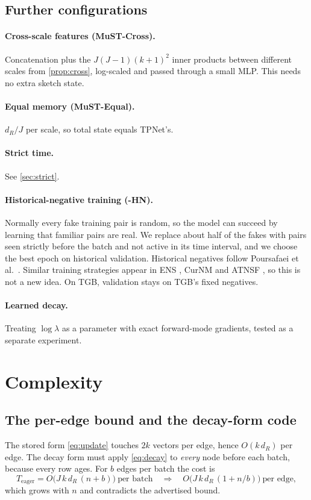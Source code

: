 \documentclass[11pt,a4paper]{article}
\theoremstyle{remark}
\begin{document}
\subsection{Further configurations}
\paragraph{Cross-scale features (MuST-Cross).} Concatenation plus the $J(J-1)(k+1)^2$ inner products between different scales from \cref{prop:cross}, log-scaled and passed through a small MLP. This needs no extra sketch state.
\paragraph{Equal memory (MuST-Equal).} $d_R/J$ per scale, so total state equals TPNet's.
\paragraph{Strict time.} See \cref{sec:strict}.
\paragraph{Historical-negative training (-HN).} Normally every fake training pair is random, so the model can succeed by learning that familiar pairs are real. We replace about half of the fakes with pairs seen strictly before the batch and not active in its time interval, and we choose the best epoch on historical validation. Historical negatives follow Poursafaei et al.\ \cite{poursafaei}. Similar training strategies appear in ENS \cite{ens}, CurNM \cite{curnm} and ATNSF \cite{atnsf}, so this is not a new idea. On TGB, validation stays on TGB's fixed negatives.
\paragraph{Learned decay.} Treating $\log\lambda$ as a parameter with exact forward-mode gradients, tested as a separate experiment.

\section{Complexity}\label{sec:lazy}
\subsection{The per-edge bound and the decay-form code}
The stored form \eqref{eq:update} touches $2k$ vectors per edge, hence $O(k\,d_R)$ per edge. The decay form must apply \eqref{eq:decay} to \emph{every} node before each batch, because every row ages. For $b$ edges per batch the cost is
\begin{equation}
T_{\text{eager}}=O\bigl(J\,k\,d_R\,(n+b)\bigr)\ \text{per batch}\quad\Longrightarrow\quad O\bigl(J\,k\,d_R\,(1+n/b)\bigr)\ \text{per edge},
\end{equation}
which grows with $n$ and contradicts the advertised bound.
\end{document}
